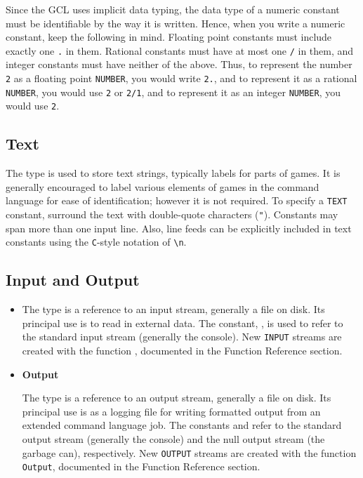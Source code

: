 Since the GCL uses implicit data typing, the data type of a numeric
constant must be identifiable by the way it is written.  Hence, when
you write a numeric constant, keep the following in mind.  Floating
point constants must include exactly one \verb+.+ in them.  Rational
constants must have at most one \verb+/+ in them, and integer
constants must have neither of the above. Thus, to represent the
number \verb+2+ as a floating point \verb+NUMBER+, you would write
\verb+2.+, and to represent it as a rational \verb+NUMBER+, you would
use \verb+2+ or \verb+2/1+, and to represent it as an integer
\verb+NUMBER+, you would use \verb+2+.

\subsection{Text}

The  type is used to store text strings, typically labels
for parts of games.  It is generally encouraged to label various
elements of games in the command language for ease of identification;
however it is not required.  To specify a {\tt TEXT} constant,
surround the text with double-quote characters ({\tt "}).  Constants
may span more than one input line.  Also, line feeds can be explicitly
included in text constants using the \verb+C+-style notation of
\verb+\n+. 

\subsection{Input and Output}

\begin{itemize}
\item{}

The  type is a reference to an input stream, generally a
file on disk.  Its principal use is to read in external data.  The
constant, , is used to refer to the standard input stream
(generally the console).  New \verb+INPUT+ streams are created with
the function , documented in the Function Reference
section.

\item {\bf Output}

The  type is a reference to an output stream, generally a
file on disk.  Its principal use is as a logging file for writing
formatted output from an extended command language job.  The
constants  and  refer to the standard
output stream (generally the console) and the null output stream (the
garbage can), respectively.  New \verb+OUTPUT+ streams are created with the 
function \verb+Output+, documented in the Function Reference section.
\end{itemize}

